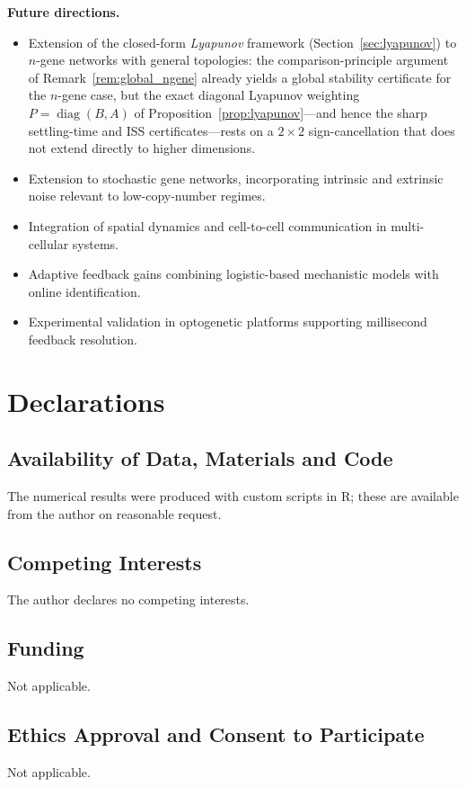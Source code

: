 \documentclass[12pt]{article}
\begin{document}
\medskip
\noindent\textbf{Future directions.}
\begin{itemize}
  \item Extension of the closed-form \emph{Lyapunov} framework
        (Section~\ref{sec:lyapunov}) to $n$-gene networks with general
        topologies: the comparison-principle argument of
        Remark~\ref{rem:global_ngene} already yields a global stability
        certificate for the $n$-gene case, but the exact diagonal Lyapunov
        weighting $P=\operatorname{diag}(B,A)$ of
        Proposition~\ref{prop:lyapunov}---and hence the sharp
        settling-time and ISS certificates---rests on a $2\times 2$
        sign-cancellation that does not extend directly to higher
        dimensions.
  \item Extension to stochastic gene networks, incorporating intrinsic and
        extrinsic noise relevant to low-copy-number regimes.
  \item Integration of spatial dynamics and cell-to-cell communication in
        multi-cellular systems.
  \item Adaptive feedback gains combining logistic-based mechanistic models
        with online identification.
  \item Experimental validation in optogenetic platforms supporting millisecond
        feedback resolution.
\end{itemize}

\section*{Declarations}

\subsection*{Availability of Data, Materials and Code}
The numerical results were produced with custom scripts in R; these are
available from the author on reasonable request.

\subsection*{Competing Interests}
The author declares no competing interests.

\subsection*{Funding}
Not applicable.

\subsection*{Ethics Approval and Consent to Participate}
Not applicable.
\end{document}
